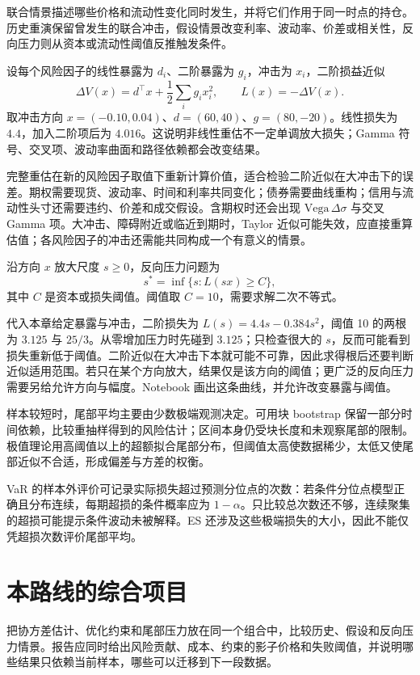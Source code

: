 联合情景描述哪些价格和流动性变化同时发生，并将它们作用于同一时点的持仓。历史重演保留曾发生的联合冲击，假设情景改变利率、波动率、价差或相关性，反向压力则从资本或流动性阈值反推触发条件。


设每个风险因子的线性暴露为 $d_i$、二阶暴露为 $g_i$，冲击为 $x_i$，二阶损益近似
\[
 \Delta V(x)=d^\top x+\frac12\sum_i g_ix_i^2,
 \qquad L(x)=-\Delta V(x).
\]
取冲击方向 $x=(-0.10,0.04)$、$d=(60,40)$、$g=(80,-20)$。线性损失为 $4.4$，加入二阶项后为 $4.016$。这说明非线性重估不一定单调放大损失；Gamma 符号、交叉项、波动率曲面和路径依赖都会改变结果。

完整重估在新的风险因子取值下重新计算价值，适合检验二阶近似在大冲击下的误差。期权需要现货、波动率、时间和利率共同变化；债券需要曲线重构；信用与流动性头寸还需要违约、价差和成交假设。含期权时还会出现 $\mathrm{Vega}\,\Delta\sigma$ 与交叉 Gamma 项。大冲击、障碍附近或临近到期时，Taylor 近似可能失效，应直接重算估值；各风险因子的冲击还需能共同构成一个有意义的情景。


沿方向 $x$ 放大尺度 $s\ge0$，反向压力问题为
\[
 s^*=\inf\{s:L(sx)\ge C\},
\]
其中 $C$ 是资本或损失阈值。阈值取 $C=10$，需要求解二次不等式。

代入本章给定暴露与冲击，二阶损失为 $L(s)=4.4s-0.384s^2$，阈值 10 的两根为 $3.125$ 与 $25/3$。从零增加压力时先碰到 $3.125$；只检查很大的 $s$，反而可能看到损失重新低于阈值。二阶近似在大冲击下本就可能不可靠，因此求得根后还要判断近似适用范围。若只在某个方向放大，结果仅是该方向的阈值；更广泛的反向压力需要另给允许方向与幅度。Notebook 画出这条曲线，并允许改变暴露与阈值。



样本较短时，尾部平均主要由少数极端观测决定。可用块 bootstrap 保留一部分时间依赖，比较重抽样得到的风险估计；区间本身仍受块长度和未观察尾部的限制。极值理论用高阈值以上的超额拟合尾部分布，但阈值太高使数据稀少，太低又使尾部近似不合适，形成偏差与方差的权衡。

VaR 的样本外评价可记录实际损失超过预测分位点的次数：若条件分位点模型正确且分布连续，每期超损的条件概率应为 $1-\alpha$。只比较总次数还不够，连续聚集的超损可能提示条件波动未被解释。ES 还涉及这些极端损失的大小，因此不能仅凭超损次数评价尾部平均。

\section{本路线的综合项目}

把协方差估计、优化约束和尾部压力放在同一个组合中，比较历史、假设和反向压力情景。报告应同时给出风险贡献、成本、约束的影子价格和失败阈值，并说明哪些结果只依赖当前样本，哪些可以迁移到下一段数据。




